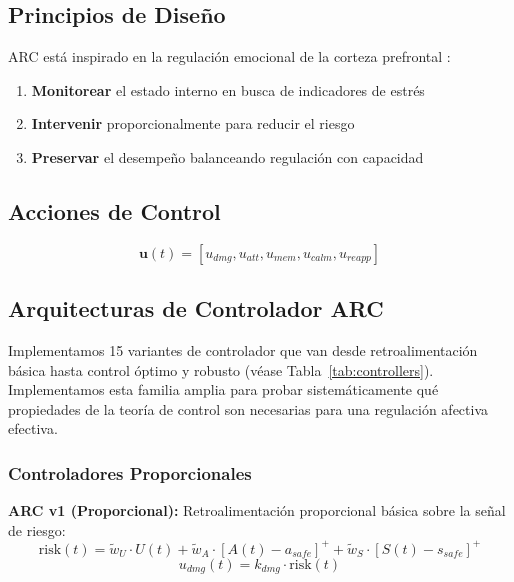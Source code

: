 \documentclass{article}
\begin{document}
\subsection{Principios de Diseño}

ARC está inspirado en la regulación emocional de la corteza prefrontal \cite{Ochsner2005}:
\begin{enumerate}
    \item \textbf{Monitorear} el estado interno en busca de indicadores de estrés
    \item \textbf{Intervenir} proporcionalmente para reducir el riesgo
    \item \textbf{Preservar} el desempeño balanceando regulación con capacidad
\end{enumerate}

\subsection{Acciones de Control}

\begin{equation}
\mathbf{u}(t) = [u_{dmg}, u_{att}, u_{mem}, u_{calm}, u_{reapp}]
\end{equation}

\subsection{Arquitecturas de Controlador ARC}

Implementamos 15 variantes de controlador que van desde retroalimentación básica hasta control óptimo y robusto (véase Tabla~\ref{tab:controllers}). Implementamos esta familia amplia para probar sistemáticamente qué propiedades de la teoría de control son necesarias para una regulación afectiva efectiva.

\subsubsection{Controladores Proporcionales}

\textbf{ARC v1 (Proporcional):} Retroalimentación proporcional básica sobre la señal de riesgo:
\begin{equation}
\text{risk}(t) = \tilde{w}_U \cdot U(t) + \tilde{w}_A \cdot [A(t) - a_{safe}]^+ + \tilde{w}_S \cdot [S(t) - s_{safe}]^+
\end{equation}
\begin{equation}
u_{dmg}(t) = k_{dmg} \cdot \text{risk}(t)
\end{equation}
\end{document}
